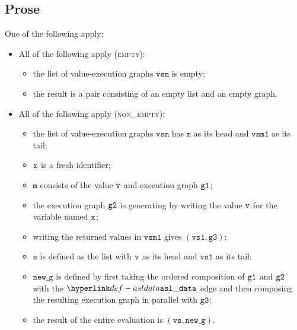 \documentclass{book}
\newcommand\newg[0]{\texttt{new\_g}}
\newcommand\vm[0]{\texttt{m}}
\newcommand\vs[0]{\texttt{s}}
\newcommand\vvs[0]{\texttt{vs}}
\newcommand\vvsone[0]{\texttt{vs1}}
\newcommand\vgthree[0]{\texttt{g3}}
\newcommand\vvsm[0]{\texttt{vsm}}
\newcommand\vvsmone[0]{\texttt{vsm1}}
\begin{document}
\subsection{Prose}
  One of the following apply:
  \begin{itemize}
  \item All of the following apply (\textsc{empty}):
  \begin{itemize}
    \item the list of value-execution graphs $\vvsm$ is empty;
    \item the result is a pair consisting of an empty list and an empty graph.
  \end{itemize}

  \item All of the following apply (\textsc{non\_empty}):
  \begin{itemize}
    \item the list of value-execution graphs $\vvsm$ has $\vm$ as its head and $\vvsmone$ as its tail;
    \item $\texttt{x}$ is a fresh identifier;
    \item $\vm$ consists of the value $\texttt{v}$ and execution graph $\texttt{g1}$;
    \item the execution graph $\texttt{g2}$ is generating by writing the value $\texttt{v}$ for the variable named $\texttt{x}$;
    \item writing the returned values in $\vvsmone$ gives $(\vvsone, \vgthree)$;
    \item $\vs$ is defined as the list with $\texttt{v}$ as its head and $\vvsone$ as its tail;
    \item $\newg$ is defined by first taking the ordered composition of $\texttt{g1}$ and $\texttt{g2}$ with the $\asldata$ edge
    and then composing the resulting execution graph in parallel with $\vgthree$;
    \item the result of the entire evaluation is $(\vvs, \newg)$.
  \end{itemize}
\end{itemize}

%
\end{document}
